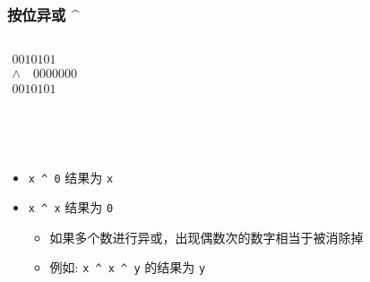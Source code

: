 \begin{frame}[fragile]
    \frametitle{按位异或 \textasciicircum}

    \begin{columns}

        $
        \begin{array}{r}
                        0010101 \\
        \wedge \quad    0000000 \\ \hline
                        0010101
        \end{array}
        $

        
    \end{columns}

    \quad \\
    \quad \\

    \begin{itemize}
        \item<1-> \lstinline|x ^ 0| 结果为 \lstinline|x|
        \item<2-> \lstinline|x ^ x| 结果为 \lstinline|0|
        
        \begin{itemize}
            \item 如果多个数进行异或，出现偶数次的数字相当于被消除掉
            \item 例如: \lstinline|x ^ x ^ y| 的结果为 \lstinline|y|
        \end{itemize}

    \end{itemize}

\end{frame}

